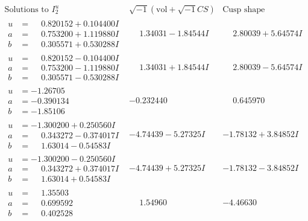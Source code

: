 \documentclass[1p]{elsarticle_modified}
\theoremstyle{definition}
\newcommand{\I}{\sqrt{-1}}
\begin{document}
$$\begin{array}{c|c|c}  
\text{Solutions to }I^u_{2}& \I (\text{vol} + \sqrt{-1}CS) & \text{Cusp shape}\\
 \hline 
\begin{aligned}
u &= \phantom{-}0.820152 + 0.104400 I \\
a &= \phantom{-}0.753200 + 1.119880 I \\
b &= \phantom{-}0.305571 + 0.530288 I\end{aligned}
 & \phantom{-}1.34031 - 1.84544 I & \phantom{-}2.80039 + 5.64574 I \\ \hline\begin{aligned}
u &= \phantom{-}0.820152 - 0.104400 I \\
a &= \phantom{-}0.753200 - 1.119880 I \\
b &= \phantom{-}0.305571 - 0.530288 I\end{aligned}
 & \phantom{-}1.34031 + 1.84544 I & \phantom{-}2.80039 - 5.64574 I \\ \hline\begin{aligned}
u &= -1.26705\phantom{ +0.000000I} \\
a &= -0.390134\phantom{ +0.000000I} \\
b &= -1.85106\phantom{ +0.000000I}\end{aligned}
 & -0.232440\phantom{ +0.000000I} & \phantom{-}0.645970\phantom{ +0.000000I} \\ \hline\begin{aligned}
u &= -1.300200 + 0.250560 I \\
a &= \phantom{-}0.343272 - 0.374017 I \\
b &= \phantom{-}1.63014 - 0.54583 I\end{aligned}
 & -4.74439 - 5.27325 I & -1.78132 + 3.84852 I \\ \hline\begin{aligned}
u &= -1.300200 - 0.250560 I \\
a &= \phantom{-}0.343272 + 0.374017 I \\
b &= \phantom{-}1.63014 + 0.54583 I\end{aligned}
 & -4.74439 + 5.27325 I & -1.78132 - 3.84852 I \\ \hline\begin{aligned}
u &= \phantom{-}1.35503\phantom{ +0.000000I} \\
a &= \phantom{-}0.699592\phantom{ +0.000000I} \\
b &= \phantom{-}0.402528\phantom{ +0.000000I}\end{aligned}
 & \phantom{-}1.54960\phantom{ +0.000000I} & -4.46630\phantom{ +0.000000I} \\ \hline\begin{aligned}

\end{aligned}
\end{array}$$
\end{document}
